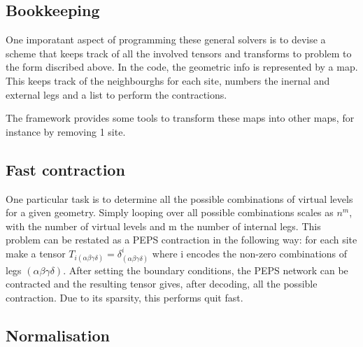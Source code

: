 \subsection{Bookkeeping}

One imporatant aspect of programming these general solvers is to devise a scheme that keeps track of all the involved tensors and transforms to problem to the form discribed above. In the code, the geometric info is represented by a map. This keeps track of the neighbourghs for each site, numbers the inernal and external legs and a list to perform the contractions.

The framework provides some tools to transform these maps into other maps, for instance by removing 1 site.

\subsection{Fast contraction}

One particular task is to determine all the possible combinations of virtual levels for a given geometry. Simply looping over all possible combinations scales as $n^m$, with the number of virtual levels and m the number of internal legs. This problem can be restated as a PEPS contraction in the following way: for each site make a tensor $ T_{i (\alpha \beta \gamma \delta )} = \delta^i_{(\alpha \beta \gamma \delta )} $ where i encodes the non-zero combinations of legs $(\alpha \beta \gamma \delta)$. After setting the boundary conditions, the PEPS network can be contracted and the resulting tensor gives, after decoding, all the possible contraction. Due to its sparsity, this performs quit fast.


\subsection{Normalisation}


